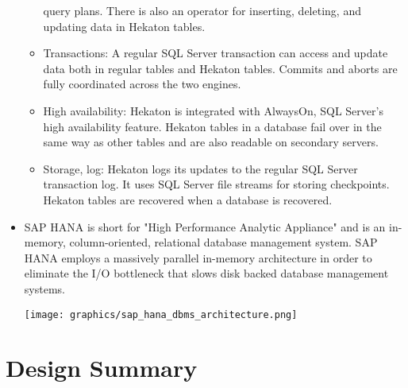 \documentclass[letterpaper, 12pt]{article}
\begin{document}
\begin{itemize}
\begin{itemize}
  query plans. There is also an operator for inserting, deleting,
  and updating data in Hekaton tables.
  \item Transactions: A regular SQL Server transaction can access
  and update data both in regular tables and Hekaton tables.
  Commits and aborts are fully coordinated across the two engines.
  \item High availability: Hekaton is integrated with AlwaysOn,
  SQL Server’s high availability feature. Hekaton tables in a database
  fail over in the same way as other tables and are also
  readable on secondary servers.
  \item Storage, log: Hekaton logs its updates to the regular SQL
  Server transaction log. It uses SQL Server file streams for storing
  checkpoints. Hekaton tables are recovered when a database is recovered.
  \end{itemize} \cite{hekaton}

  \item SAP HANA
  is short for "High Performance Analytic Appliance" and is an in-memory,
  column-oriented, relational database management system. SAP HANA employs a
  massively parallel in-memory architecture in order to eliminate the I/O bottleneck
  that slows disk backed database management systems.
  \par\vspace{\baselineskip}
  \texttt{[image: graphics/sap\_hana\_dbms\_architecture.png]}
  \cite{saphana}
  \par\vspace{\baselineskip}
\end{itemize}

\newpage

\section{Design Summary}
\end{document}

